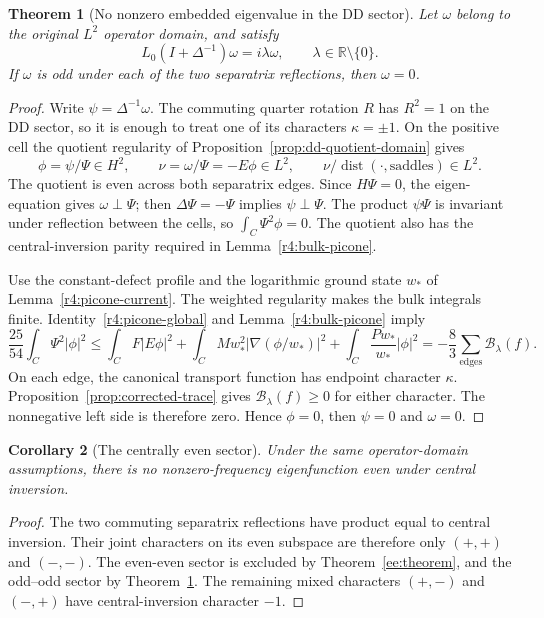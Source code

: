 \documentclass[reqno,11pt]{amsart}
\numberwithin{equation}{section}
\newtheorem{theorem}{Theorem}[section]
\newtheorem{corollary}[theorem]{Corollary}
\theoremstyle{remark}
\begin{document}
\begin{theorem}[No nonzero embedded eigenvalue in the DD sector]\label{r4:dd-exclusion}
Let $\omega$ belong to the original $L^2$ operator domain, and satisfy
\[
 L_0(I+\Delta^{-1})\omega=i\lambda\omega,
 \qquad \lambda\in\mathbb R\setminus\{0\}.
\]
If $\omega$ is odd under each of the two separatrix reflections, then
$\omega=0$.
\end{theorem}
\begin{proof}
Write $\psi=\Delta^{-1}\omega$. The commuting quarter rotation $R$
has $R^2=1$ on the DD sector, so it is enough to treat one of its
characters $\kappa=\pm1$. On the positive cell the quotient
regularity of Proposition~\ref{prop:dd-quotient-domain} gives
\[
 \phi=\psi/\Psi\in H^2,\qquad
 \nu=\omega/\Psi=-E\phi\in L^2,\qquad
 \nu/\operatorname{dist}(\cdot,\text{saddles})\in L^2.
\]
The quotient is even across both separatrix edges. Since $H\Psi=0$,
the eigen-equation gives $\omega\perp\Psi$; then $\Delta\Psi=-\Psi$
implies $\psi\perp\Psi$. The product $\psi\Psi$ is invariant under
reflection between the cells, so $\int_C\Psi^2\phi=0$. The quotient
also has the central-inversion parity required in Lemma~\ref{r4:bulk-picone}.

Use the constant-defect profile and the logarithmic ground state
$w_*$ of Lemma~\ref{r4:picone-current}. The weighted regularity makes
the bulk integrals finite. Identity~\eqref{r4:picone-global} and
Lemma~\ref{r4:bulk-picone} imply
\[
 \frac{25}{54}\int_C\Psi^2|\phi|^2
 \le \int_C F|E\phi|^2
 +\int_C Mw_*^2|\nabla(\phi/w_*)|^2
 +\int_C\frac{Pw_*}{w_*}|\phi|^2
 =-\frac83\sum_{\text{edges}}\mathcal B_\lambda(f).
\]
On each edge, the canonical transport function has endpoint character
$\kappa$. Proposition~\ref{prop:corrected-trace} gives
$\mathcal B_\lambda(f)\ge0$ for either character. The nonnegative
left side is therefore zero. Hence $\phi=0$, then $\psi=0$ and
$\omega=0$.
\end{proof}

\begin{corollary}[The centrally even sector]\label{r4:central-even}
Under the same operator-domain assumptions, there is no
nonzero-frequency eigenfunction even under central inversion.
\end{corollary}
\begin{proof}
The two commuting separatrix reflections have product equal to central
inversion. Their joint characters on its even subspace are therefore
only $(+,+)$ and $(-,-)$. The even-even sector is excluded by
Theorem~\ref{ee:theorem}, and the odd--odd sector by
Theorem~\ref{r4:dd-exclusion}. The remaining mixed characters
$(+,-)$ and $(-,+)$ have central-inversion character $-1$.
\end{proof}
\end{document}
